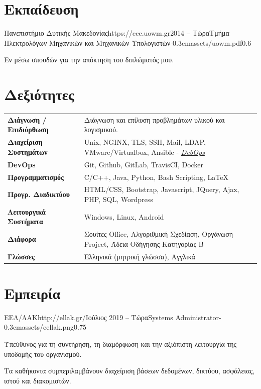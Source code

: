 \documentclass{mycv}
\begin{document}
	\section{Εκπαίδευση}
	
	\begin{EntryDatedLogo}{Πανεπιστήμιο Δυτικής Μακεδονίας}{https://ece.uowm.gr}{2014 -- Τώρα}{Τμήμα Ηλεκτρολόγων Μηχανικών και Μηχανικών Υπολογιστών}{-0.3cm}{assets/uowm.pdf}{0.6}
	\begin{Itemize}
		\item Εν μέσω σπουδών για την απόκτηση του διπλώματός μου.
	\end{Itemize}
	\end{EntryDatedLogo}

	\section{Δεξιότητες}
	\begin{tabular}{m{4.5cm} m{13cm}}
		\textbf{Διάγνωση / Επιδιόρθωση}     & Διάγνωση και επίλυση προβλημάτων υλικού και λογισμικού. \\
		\textbf{Διαχείριση Συστημάτων}		& Unix, NGINX, TLS, SSH, Mail, LDAP, VMware/Virtualbox, Ansible - \href{https://debops.org}{\textit{DebOps}} \\
		\textbf{DevOps}	                    & Git, Github, GitLab, TravisCI, Docker \\
		\textbf{Προγραμματισμός} 	 	  	& C/C++, Java, Python, Bash Scripting, \LaTeX \\
		\textbf{Προγρ. Διαδικτύου}	  		& HTML/CSS, Bootstrap, Javascript, JQuery, Ajax, PHP, SQL, Wordpress \\
		\textbf{Λειτουργικά Συστήματα}   	& Windows, Linux, Android \\
		\textbf{Διάφορα}        		 	& Σουίτες Office, Αλγοριθμική Σχεδίαση, Οργάνωση Project, Άδεια Οδήγησης Κατηγορίας Β \\
		\textbf{Γλώσσες} 			   		& Ελληνικά (μητρική γλώσσα), Αγγλικά 
	\end{tabular}

	\section{Εμπειρία}
	
	\begin{EntryDatedLogo}{ΕΕΛ/ΛΑΚ}{http://ellak.gr/}{Ιούλιος 2019 -- Τώρα}{Systems Administrator}{-0.3cm}{assets/eellak.png}{0.75}
		\begin{Itemize}
			\item Υπεύθυνος για τη συντήρηση, τη διαμόρφωση και την αξιόπιστη λειτουργία της υποδομής του οργανισμού. 
			\item Τα καθήκοντα συμπεριλαμβάνουν διαχείριση βάσεων δεδομένων, δικτύου, ασφάλειας, ιστού και διακομιστών.
		\end{Itemize}
	\end{EntryDatedLogo}
\end{document}
